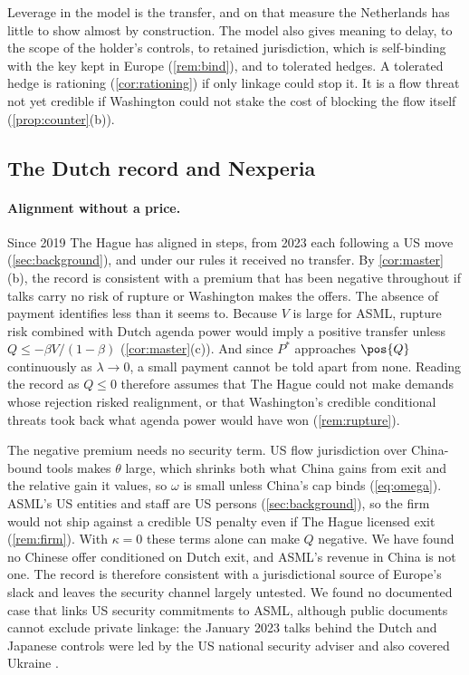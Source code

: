 Leverage in the model is the transfer, and on that measure the Netherlands has little to show almost by construction. The model also gives meaning to delay, to the scope of the holder's controls, to retained jurisdiction, which is self-binding with the key kept in Europe (\cref{rem:bind}), and to tolerated hedges. A tolerated hedge is rationing (\cref{cor:rationing}) if only linkage could stop it. It is a flow threat not yet credible if Washington could not stake the cost of blocking the flow itself (\cref{prop:counter}(b)).

\subsection{The Dutch record and Nexperia}\label{sec:record}

\paragraph{Alignment without a price.} Since 2019 The Hague has aligned in steps, from 2023 each following a US move (\cref{sec:background}), and under our rules it received no transfer. By \cref{cor:master}(b), the record is consistent with a premium that has been negative throughout if talks carry no risk of rupture or Washington makes the offers. The absence of payment identifies less than it seems to. Because $V$ is large for ASML, rupture risk combined with Dutch agenda power would imply a positive transfer unless $Q\le-\beta V/(1-\beta)$ (\cref{cor:master}(c)). And since $P^*$ approaches $\pos{Q}$ continuously as $\lambda\to 0$, a small payment cannot be told apart from none. Reading the record as $Q\le0$ therefore assumes that The Hague could not make demands whose rejection risked realignment, or that Washington's credible conditional threats took back what agenda power would have won (\cref{rem:rupture}).

The negative premium needs no security term. US flow jurisdiction over China-bound tools makes $\theta$ large, which shrinks both what China gains from exit and the relative gain it values, so $\omega$ is small unless China's cap binds (\cref{eq:omega}). ASML's US entities and staff are US persons (\cref{sec:background}), so the firm would not ship against a credible US penalty even if The Hague licensed exit (\cref{rem:firm}). With $\kappa=0$ these terms alone can make $Q$ negative. We have found no Chinese offer conditioned on Dutch exit, and ASML's revenue in China is not one. The record is therefore consistent with a jurisdictional source of Europe's slack and leaves the security channel largely untested. We found no documented case that links US security commitments to ASML, although public documents cannot exclude private linkage: the January 2023 talks behind the Dutch and Japanese controls were led by the US national security adviser and also covered Ukraine \citep{durbin2023biden}.

